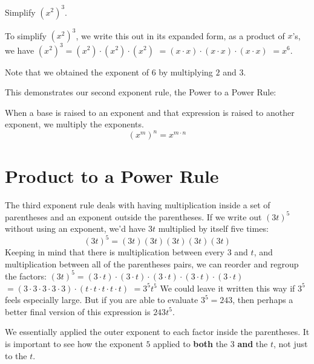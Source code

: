 \documentclass{ximera}
\begin{document}
\begin{example}
          Simplify $\left(x^2\right)^3$.\\
\begin{explanation}
          To simplify $\left(x^2\right)^3$,
          we write this out in its expanded form,
          as a product of $x$'s, we have
            $\left(x^2\right)^3 =\left(x^2\right) \cdot \left(x^2\right)\cdot\left(x^2\right)$
            $=(x \cdot x)\cdot (x \cdot x)\cdot (x \cdot x)$
            $=x^6$.
     \end{explanation}
           
           Note that we obtained the exponent of $6$ by multiplying $2$ and $3$.
\end{example}
      This demonstrates our second exponent rule,
      the Power to a Power Rule:
\begin{theorem}
      When a base is raised to an exponent and that expression is raised to another exponent,
      we multiply the exponents.
   $$
      \left(x^m\right)^n = x^{m \cdot n}
   $$
\end{theorem}

      \section{Product to a Power Rule}
        The third exponent rule deals with having multiplication inside a set of parentheses and an exponent outside the parentheses.
        If we write out $\left(3t\right)^5$ without using an exponent,
        we'd have $3t$ multiplied by itself five times:
$$
      (3t)^5= (3t)(3t)(3t)(3t)(3t)
$$
        Keeping in mind that there is multiplication between every $3$ and $t$,
        and multiplication between all of the parentheses pairs,
        we can reorder and regroup the factors:
          $\left(3t\right)^5 = (3\cdot t)\cdot (3\cdot t)\cdot (3\cdot t)\cdot (3\cdot t)\cdot (3\cdot t)$
          $= \left(3\cdot 3\cdot 3\cdot 3\cdot 3 \right) \cdot \left(t \cdot t \cdot t \cdot t \cdot t\right)$
          $= 3^5 t^5$
        We could leave it written this way if $3^5$ feels especially large.
        But if you are able to evaluate $3^5=243$,
        then perhaps a better final version of this expression is $243t^5$.
 
        We essentially applied the outer exponent to each factor inside the parentheses.
        It is important to see how the exponent $5$ applied to \textbf{both} the $3$ \textbf{and} the $t$,
        not just to the $t$.
   
\end{document}
